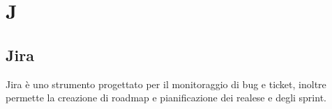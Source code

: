 \section{J}

\subsection{Jira}%
Jira è uno strumento progettato per il monitoraggio di bug e ticket, inoltre permette la creazione di roadmap e pianificazione dei realese e degli sprint.
\clearpage